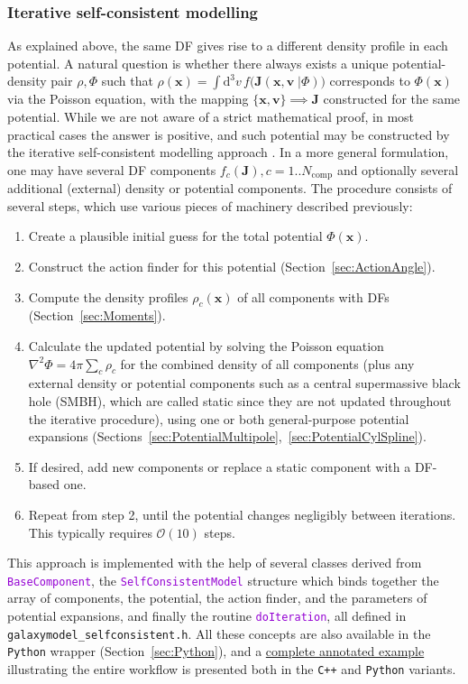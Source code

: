 \documentclass[12pt]{article}
\newcommand{\Cpp}  {\texttt{C++}\xspace}
\newcommand{\Python}{\texttt{Python}\xspace}
\newcommand{\ttt}[1]{\textcolor{darkviolet}{\texttt{#1}}}
\renewcommand{\d}{\mathrm{d}}
\newcommand{\bv}{\boldsymbol{v}}
\newcommand{\bx}{\boldsymbol{x}}
\newcommand{\bJ}{\boldsymbol{J}}
\begin{document}
\subsubsection{Iterative self-consistent modelling}  \label{sec:SCM}

As explained above, the same DF gives rise to a different density profile in each potential. A natural question is whether there always exists a unique potential-density pair $\rho,\Phi$ such that $\rho(\bx)=\int \d ^3v\,f\big(\bJ(\bx,\bv\;|\Phi)\big)$ corresponds to $\Phi(\bx)$ via the Poisson equation, with the mapping $\{\bx,\bv\}\implies \bJ$ constructed for the same potential.
While we are not aware of a strict mathematical proof, in most practical cases the answer is positive, and such potential may be constructed by the iterative self-consistent modelling approach \cite{Binney2014,Piffl2015}. 
In a more general formulation, one may have several DF components $f_c(\bJ), c=1..N_\mathrm{comp}$ and optionally several additional (external) density or potential components. The procedure consists of several steps, which use various pieces of machinery described previously:
\begin{enumerate}  \setlength{\parskip}{2pt} \setlength{\itemsep}{2pt}
\item Create a plausible initial guess for the total potential $\Phi(\bx)$.
\item Construct the action finder for this potential (Section~\ref{sec:ActionAngle}).
\item Compute the density profiles $\rho_c(\bx)$ of all components with DFs (Section~\ref{sec:Moments}).
\item Calculate the updated potential by solving the Poisson equation $\nabla^2\Phi = 4\pi\sum_c\rho_c$ for the combined density of all components (plus any external density or potential components such as a central supermassive black hole (SMBH), which are called static since they are not updated throughout the iterative procedure), using one or both general-purpose potential expansions (Sections~\ref{sec:PotentialMultipole},~\ref{sec:PotentialCylSpline}).
\item If desired, add new components or replace a static component with a DF-based one.
\item Repeat from step 2, until the potential changes negligibly between iterations. This typically requires $\mathcal{O}(10)$ steps.
\end{enumerate}

This approach is implemented with the help of several classes derived from \ttt{BaseComponent}, the \ttt{SelfConsistentModel} structure which binds together the array of components, the potential, the action finder, and the parameters of potential expansions, and finally the routine \ttt{doIteration}, all defined in \texttt{galaxymodel_selfconsistent.h}. All these concepts are also available in the \Python wrapper (Section~\ref{sec:Python}), and a \hyperref[sec:ExampleSCM]{complete annotated example} illustrating the entire workflow is presented both in the \Cpp and \Python variants.
\end{document}
